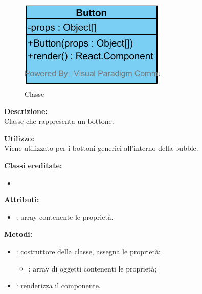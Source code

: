 \paragraph[::Button]{\class}\mbox{}\\ \label{\class}
\begin{figure}[H]
	\centering
	\includegraphics[width=7cm]{./diagrammi/framework/view/gui/button.png}
	\caption{Classe \class}
\end{figure}
\textbf{Descrizione:}\\
Classe che rappresenta un bottone.

\textbf{Utilizzo:}\\
Viene utilizzato per i bottoni generici all'interno della bubble.

\textbf{Classi ereditate:}
\begin{itemize}
	\item {}
\end{itemize}


\textbf{Attributi:}
\begin{itemize}
	\item {}: array contenente le proprietà.
\end{itemize}

\textbf{Metodi:}
\begin{itemize}
	\item {}: costruttore della classe, assegna le proprietà:
	\begin{itemize}
		\item {}: array di oggetti contenenti le proprietà;
	\end{itemize}
	\item {}: renderizza il componente.
\end{itemize}

